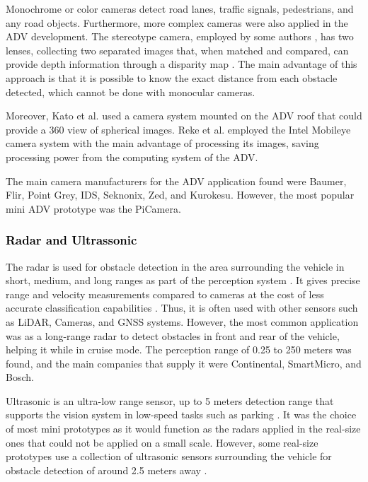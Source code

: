 \documentclass[lettersize,journal]{IEEEtran}
\begin{document}
Monochrome or color cameras detect road lanes, traffic signals, pedestrians, and any road objects. Furthermore, more complex cameras were also applied in the ADV development. The stereotype camera, employed by some authors \cite{Broggi2015a,Broggi2015,Martin2016,Belcarz2018,Marin-Plaza2019,el2020,fayjie2018,Fathy2020,Tas2018a,Karaman2017,roestam2019}, has two lenses, collecting two separated images that, when matched and compared, can provide depth information through a disparity map \cite{Marin-Plaza2019}. The main advantage of this approach is that it is possible to know the exact distance from each obstacle detected, which cannot be done with monocular cameras.

Moreover, Kato et al. \cite{Kato2015} used a camera system mounted on the ADV roof that could provide a 360 view of spherical images. Reke et al. \cite{Reke2020} employed the Intel Mobileye camera system with the main advantage of processing its images, saving processing power from the computing system of the ADV. 
 
The main camera manufacturers for the ADV application found were Baumer, Flir, Point Grey, IDS, Seknonix, Zed, and Kurokesu. However, the most popular mini ADV prototype was the PiCamera.

\vspace{\baselineskip}

\subsubsection {\textcolor{black}{\textbf{Radar and Ultrassonic}}}

\leavevmode\vspace{0.1\baselineskip}%
 
The radar is used for obstacle detection in the area surrounding the vehicle in short, medium, and long ranges as part of the perception system \cite{Tas2018a}. It gives precise range and velocity measurements compared to cameras at the cost of less accurate classification capabilities \cite{Kunz2015}. Thus, it is often used with other sensors such as LiDAR, Cameras, and GNSS systems. However, the most common application was as a long-range radar to detect obstacles in front and rear of the vehicle, helping it while in cruise mode. The perception range of 0.25 to 250 meters was found, and the main companies that supply it were Continental, SmartMicro, and Bosch.
 
 Ultrasonic is an ultra-low range sensor, up to 5 meters detection range that supports the vision system in low-speed tasks such as parking \cite{Zong2018}. It was the choice of most mini prototypes as it would function as the radars applied in the real-size ones that could not be applied on a small scale. However, some real-size prototypes use a collection of ultrasonic sensors surrounding the vehicle for obstacle detection of around 2.5 meters away \cite{Buechel2015,Betz2019,Reke2020}.
 
\end{document}
